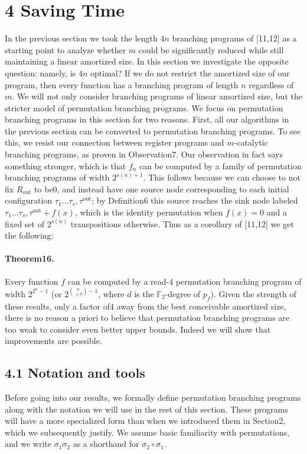 \documentclass[10pt,a4paper]{article}
\begin{document}
\section*{4 Saving Time}
In the previous section we took the length $4n$ branching programs of [11,12] as a starting point to analyze whether $m$ could be significantly reduced while still maintaining a linear amortized size. In this section we investigate the opposite question: namely, is $4n$ optimal? If we do not restrict the amortized size of our program, then every function has a branching program of length $n$ regardless of $m$. We will not only consider branching programs of linear amortized size, but the stricter model of permutation branching programs.
We focus on permutation branching programs in this section for two reasons. First, all our algorithms in the previous section can be converted to permutation branching programs. To see this, we resist our connection between register programs and $m$-catalytic branching programs, as proven in Observation7. Our observation in fact says something stronger, which is that $f_n$ can be computed by a family of permutation branching programs of width $2^{s(n)+1}$. This follows because we can choose to not fix $R_{\mathrm{out}}$ to be0, and instead have one source node corresponding to each initial configuration $\tau_1\ldots\tau_s,\tau^{\mathrm{out}}$; by Definition6 this source reaches the sink node labeled $\tau_1\ldots\tau_s,\tau^{\mathrm{out}}+f(x)$, which is the identity permutation when $f(x)=0$ and a fixed set of $2^{s(n)}$ transpositions otherwise. Thus as a corollary of [11,12] we get the following:
\paragraph{Theorem16.} Every function $f$ can be computed by a read-4 permutation branching program of width $2^{2^n-1}$ (or $2^{\binom n{\leq d}-1}$, where $d$ is the $\mathbb F_2$-degree of $p_f$).
Given the strength of these results, only a factor of4 away from the best conceivable amortized size, there is no reason a priori to believe that permutation branching programs are too weak to consider even better upper bounds. Indeed we will show that improvements are possible.

\subsection*{4.1 Notation and tools}
Before going into our results, we formally define permutation branching programs along with the notation we will use in the rest of this section. These programs will have a more specialized form than when we introduced them in Section2, which we subsequently justify. We assume basic familiarity with permutations, and we write $\sigma_1\sigma_2$ as a shorthand for $\sigma_2\circ\sigma_1$.
\end{document}
